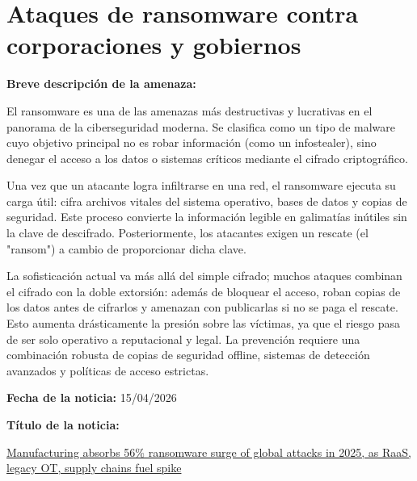 \chapter{Ataques de ransomware contra corporaciones y gobiernos}

\begin{tcolorbox}[
    title=Detalles de la Noticia, 
    colframe=black, %
    colback=gray!5,         %
    sharp corners,          %
    breakable              %
]

    \textbf{Breve descripción de la amenaza:}
    \vspace{0.5em}
    
    El ransomware es una de las amenazas más destructivas y lucrativas en el panorama de la ciberseguridad moderna. Se clasifica como un tipo de malware cuyo objetivo principal no es robar información (como un infostealer), sino denegar el acceso a los datos o sistemas críticos mediante el cifrado criptográfico.

Una vez que un atacante logra infiltrarse en una red, el ransomware ejecuta su carga útil: cifra archivos vitales del sistema operativo, bases de datos y copias de seguridad. Este proceso convierte la información legible en galimatías inútiles sin la clave de descifrado. Posteriormente, los atacantes exigen un rescate (el "ransom") a cambio de proporcionar dicha clave.

La sofisticación actual va más allá del simple cifrado; muchos ataques combinan el cifrado con la doble extorsión: además de bloquear el acceso, roban copias de los datos antes de cifrarlos y amenazan con publicarlas si no se paga el rescate. Esto aumenta drásticamente la presión sobre las víctimas, ya que el riesgo pasa de ser solo operativo a reputacional y legal. La prevención requiere una combinación robusta de copias de seguridad offline, sistemas de detección avanzados y políticas de acceso estrictas.
\vspace{0.5em}

    \textbf{Fecha de la noticia:}
    \vspace{0.5em}
    15/04/2026

    \textbf{Título de la noticia:}
    \vspace{0.5em}

    \href{https://industrialcyber.co/manufacturing/manufacturing-absorbs-56-ransomware-surge-of-global-attacks-in-2025-as-raas-legacy-ot-supply-chains-fuel-spike/}{Manufacturing absorbs 56\% ransomware surge of global attacks in 2025, as RaaS, legacy OT, supply chains fuel spike}


\end{tcolorbox}
